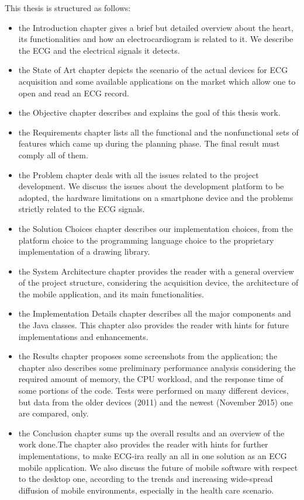 This thesis is structured as follows: 
\begin{itemize}
	\item the Introduction chapter gives a brief but detailed overview about the heart, its functionalities and how an electrocardiogram is related to it. We describe the ECG and the electrical signals it detects.
	\item the State of Art chapter depicts the scenario of the actual devices for ECG acquisition and some available applications on the market which allow one to open and read an ECG record.
	\item the Objective chapter describes and explains the goal of this thesis work.
	\item the Requirements chapter lists all the functional and the nonfunctional sets of features which came up during the planning phase. The final result must comply all of them.
	\item the Problem chapter deals with all the issues related to the project development. We discuss the issues about the development platform to be adopted, the hardware limitations on a smartphone device and the problems strictly related to the ECG signals.
	\item the Solution Choices chapter describes our implementation choices, from the platform choice to the programming language choice to the proprietary implementation of a drawing library.
	\item the System Architecture chapter provides the reader with a general overview of the project structure, considering the acquisition device, the architecture of the mobile application, and its main functionalities.
	\item the Implementation Details chapter describes all the major components and the Java classes. This chapter also provides the reader with hints for future implementations and enhancements.
	\item the Results chapter proposes some screenshots from the application; the chapter also describes some preliminary performance analysis considering the required amount of memory, the CPU workload, and the response time of some portions of the code. Tests were performed on many different devices, but data from the older devices (2011) and the newest (November 2015) one are compared, only.
	\item the Conclusion chapter sums up the overall results and an overview of the work done.The chapter also provides the reader with hints for further implementations, to make ECG-ira really an all in one solution as an ECG mobile application. We also discuss the future of mobile software with respect to the desktop one, according to the trends and increasing wide-spread diffusion of mobile environments, especially in the health care scenario.
\end{itemize}
